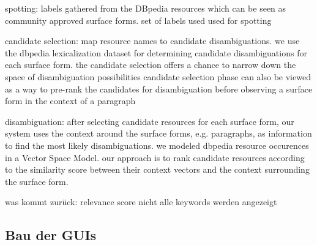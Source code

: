  spotting:
 labels gathered from the DBpedia resources which can be seen as community approved surface forms.
 set of labels used used for spotting

 candidate selection:
 map resource names to candidate disambiguations. we use the dbpedia lexicalization dataset for determining candidate disambiguations for each surface form.
 the candidate selection offers a chance to narrow down the space of disambiguation possibilities
 candidate selection phase can also be viewed as a way to pre-rank the candidates for disambiguation before observing a surface form in the context of a paragraph

 disambiguation:
 after selecting candidate resources for each surface form, our system uses the context around the surface forms, e.g. paragraphs, as information to find the most likely disambiguations.
 we modeled dbpedia resource occurences in a Vector Space Model.
 our approach is to rank candidate resources according to the similarity score between their context vectors and the context surrounding the surface form.
 \cite{mendes2011dbpedia}

was kommt zurück: relevance score
nicht alle keywords werden angezeigt
 \subsection{Bau der GUIs}

